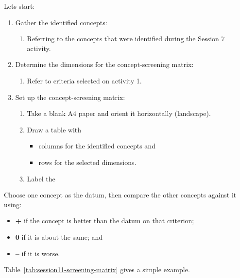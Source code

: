 Lets start:
\begin{enumerate}
    \item Gather the identified concepts:
    \begin{enumerate}
        \item Referring to the concepts that were identified during the Session 7 activity.
    \end{enumerate}
    \item Determine the dimensions for the concept-screening matrix:
    \begin{enumerate}
        \item Refer to criteria selected on activity 1.
    \end{enumerate}
    \item Set up the concept-screening matrix:
    \begin{enumerate}
        \item Take a blank A4 paper and orient it horizontally (landscape).
        \item Draw a table with
        \begin{itemize}
            \item columns for the identified concepts and
            \item rows for the selected dimensions.
        \end{itemize}
        \item Label the
    \end{enumerate}
\end{enumerate}


Choose one concept as the datum, then compare the other concepts against it using:
\begin{itemize}
    \item \textbf{+} if the concept is better than the datum on that criterion;
    \item \textbf{0} if it is about the same; and
    \item \textbf{--} if it is worse.
\end{itemize}

Table~\ref{tab:session11-screening-matrix} gives a simple example.

